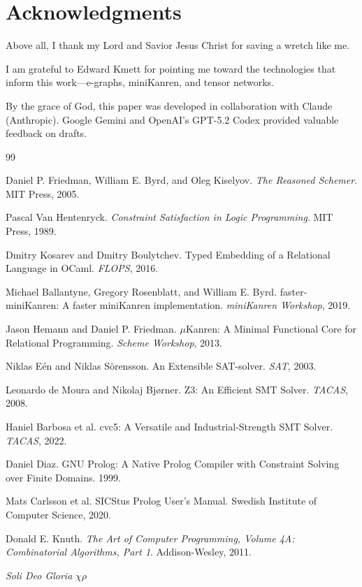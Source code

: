 \documentclass[11pt,a4paper]{article}
\begin{document}
\section*{Acknowledgments}

Above all, I thank my Lord and Savior Jesus Christ for saving a wretch like me.

I am grateful to Edward Kmett for pointing me toward the technologies that inform this work---e-graphs, miniKanren, and tensor networks.

By the grace of God, this paper was developed in collaboration with Claude
(Anthropic). Google Gemini and OpenAI's GPT-5.2 Codex provided valuable
feedback on drafts.


\begin{thebibliography}{99}

Daniel P. Friedman, William E. Byrd, and Oleg Kiselyov.
\textit{The Reasoned Schemer}.
MIT Press, 2005.

Pascal Van Hentenryck.
\textit{Constraint Satisfaction in Logic Programming}.
MIT Press, 1989.

Dmitry Kosarev and Dmitry Boulytchev.
Typed Embedding of a Relational Language in OCaml.
\textit{FLOPS}, 2016.

Michael Ballantyne, Gregory Rosenblatt, and William E. Byrd.
faster-miniKanren: A faster miniKanren implementation.
\textit{miniKanren Workshop}, 2019.

Jason Hemann and Daniel P. Friedman.
$\mu$Kanren: A Minimal Functional Core for Relational Programming.
\textit{Scheme Workshop}, 2013.

Niklas E\'{e}n and Niklas S\"{o}rensson.
An Extensible SAT-solver.
\textit{SAT}, 2003.

Leonardo de Moura and Nikolaj Bj{\o}rner.
Z3: An Efficient SMT Solver.
\textit{TACAS}, 2008.

Haniel Barbosa et al.
cvc5: A Versatile and Industrial-Strength SMT Solver.
\textit{TACAS}, 2022.

Daniel Diaz.
GNU Prolog: A Native Prolog Compiler with Constraint Solving over Finite Domains.
1999.

Mats Carlsson et al.
SICStus Prolog User's Manual.
Swedish Institute of Computer Science, 2020.

Donald E. Knuth.
\textit{The Art of Computer Programming, Volume 4A: Combinatorial Algorithms, Part 1}.
Addison-Wesley, 2011.

\end{thebibliography}

\vspace{1em}
\begin{center}
\textit{Soli Deo Gloria} $\chi\rho$
\end{center}
\end{document}
